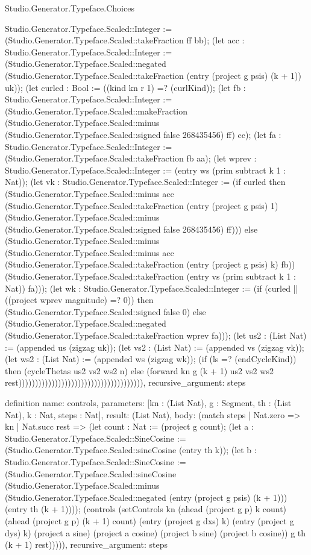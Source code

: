 \begin{lexlean}{Studio.Generator.Typeface.Choices}
\begin{semanticmodule}
{Studio.Generator.Typeface.Scaled::Integer := (Studio.Generator.Typeface.Scaled::takeFraction ff bb); (let acc : Studio.Generator.Typeface.Scaled::Integer := (Studio.Generator.Typeface.Scaled::negated (Studio.Generator.Typeface.Scaled::takeFraction (entry (project g psis) (k + 1)) uk)); (let curled : Bool := ((kind kn r 1) =? (curlKind)); (let fb : Studio.Generator.Typeface.Scaled::Integer := (Studio.Generator.Typeface.Scaled::makeFraction (Studio.Generator.Typeface.Scaled::minus (Studio.Generator.Typeface.Scaled::signed false 268435456) ff) cc); (let fa : Studio.Generator.Typeface.Scaled::Integer := (Studio.Generator.Typeface.Scaled::takeFraction fb aa); (let wprev : Studio.Generator.Typeface.Scaled::Integer := (entry ws (prim subtract k 1 : Nat)); (let vk : Studio.Generator.Typeface.Scaled::Integer := (if curled then (Studio.Generator.Typeface.Scaled::minus acc (Studio.Generator.Typeface.Scaled::takeFraction (entry (project g psis) 1) (Studio.Generator.Typeface.Scaled::minus (Studio.Generator.Typeface.Scaled::signed false 268435456) ff))) else (Studio.Generator.Typeface.Scaled::minus (Studio.Generator.Typeface.Scaled::minus acc (Studio.Generator.Typeface.Scaled::takeFraction (entry (project g psis) k) fb)) (Studio.Generator.Typeface.Scaled::takeFraction (entry vs (prim subtract k 1 : Nat)) fa))); (let wk : Studio.Generator.Typeface.Scaled::Integer := (if (curled || ((project wprev magnitude) =? 0)) then (Studio.Generator.Typeface.Scaled::signed false 0) else (Studio.Generator.Typeface.Scaled::negated (Studio.Generator.Typeface.Scaled::takeFraction wprev fa))); (let us2 : (List Nat) := (appended us (zigzag uk)); (let vs2 : (List Nat) := (appended vs (zigzag vk)); (let ws2 : (List Nat) := (appended ws (zigzag wk)); (if (ls =? (endCycleKind)) then (cycleThetas us2 vs2 ws2 n) else (forward kn g (k + 1) us2 vs2 ws2 rest)))))))))))))))))))))))))))))))))))))),
  recursive_argument: steps
}

definition{
  name: controls,
  parameters: [kn : (List Nat), g : Segment, th : (List Nat), k : Nat, steps : Nat],
  result: (List Nat),
  body: (match steps
    | Nat.zero => kn
    | Nat.succ rest => (let count : Nat := (project g count); (let a : Studio.Generator.Typeface.Scaled::SineCosine := (Studio.Generator.Typeface.Scaled::sineCosine (entry th k)); (let b : Studio.Generator.Typeface.Scaled::SineCosine := (Studio.Generator.Typeface.Scaled::sineCosine (Studio.Generator.Typeface.Scaled::minus (Studio.Generator.Typeface.Scaled::negated (entry (project g psis) (k + 1))) (entry th (k + 1)))); (controls (setControls kn (ahead (project g p) k count) (ahead (project g p) (k + 1) count) (entry (project g dxs) k) (entry (project g dys) k) (project a sine) (project a cosine) (project b sine) (project b cosine)) g th (k + 1) rest))))),
  recursive_argument: steps
}


\end{semanticmodule}
\end{lexlean}
